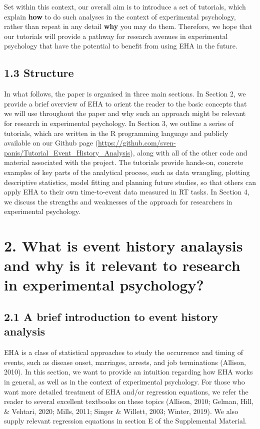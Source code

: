 \documentclass[
  man, donotrepeattitle,floatsintext]{apa6}
\begin{document}
Set within this context, our overall aim is to introduce a set of tutorials, which explain \textbf{how} to do such analyses in the context of experimental psychology, rather than repeat in any detail \textbf{why} you may do them. Therefore, we hope that our tutorials will provide a pathway for research avenues in experimental psychology that have the potential to benefit from using EHA in the future.

\subsection{1.3 Structure}\label{structure}

In what follows, the paper is organised in three main sections. In Section 2, we provide a brief overview of EHA to orient the reader to the basic concepts that we will use throughout the paper and why such an approach might be relevant for research in experimental psychology. In Section 3, we outline a series of tutorials, which are written in the R programming language and publicly available on our Github page (\url{https://github.com/sven-panis/Tutorial_Event_History_Analysis}), along with all of the other code and material associated with the project. The tutorials provide hands-on, concrete examples of key parts of the analytical process, such as data wrangling, plotting descriptive statistics, model fitting and planning future studies, so that others can apply EHA to their own time-to-event data measured in RT tasks. In Section 4, we discuss the strengths and weaknesses of the approach for researchers in experimental psychology.

\section{2. What is event history analaysis and why is it relevant to research in experimental psychology?}\label{what-is-event-history-analaysis-and-why-is-it-relevant-to-research-in-experimental-psychology}

\subsection{2.1 A brief introduction to event history analysis}\label{a-brief-introduction-to-event-history-analysis}

EHA is a class of statistical approaches to study the occurrence and timing of events, such as disease onset, marriages, arrests, and job terminations (Allison, 2010). In this section, we want to provide an intuition regarding how EHA works in general, as well as in the context of experimental psychology. For those who want more detailed treatment of EHA and/or regression equations, we refer the reader to several excellent textbooks on these topics (Allison, 2010; Gelman, Hill, \& Vehtari, 2020; Mills, 2011; Singer \& Willett, 2003; Winter, 2019). We also supply relevant regression equations in section E of the Supplemental Material.
\end{document}
